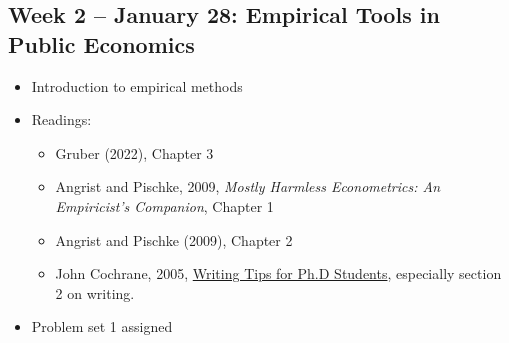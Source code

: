 \documentclass[11pt]{article}
\begin{document}
\subsection*{Week 2 -- January 28: Empirical Tools in Public Economics}
\begin{itemize}
    \setlength{\itemsep}{0em}
    \item Introduction to empirical methods
    \item Readings:
    \begin{itemize}
        \item Gruber (2022), Chapter 3
        \item Angrist and Pischke, 2009, \textit{Mostly Harmless Econometrics: An Empiricist's Companion}, Chapter 1
        \item Angrist and Pischke (2009), Chapter 2
        \item John Cochrane, 2005, \href{https://static1.squarespace.com/static/5e6033a4ea02d801f37e15bb/t/5eda74919c44fa5f87452697/1591374993570/phd_paper_writing.pdf}{Writing Tips for Ph.D Students}, especially section 2 on writing.
    \end{itemize}
    \item Problem set 1 assigned
\end{itemize}
\end{document}
